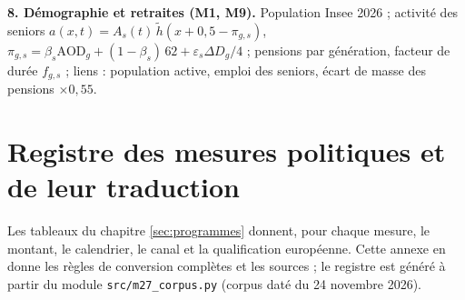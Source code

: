 \documentclass[
  11pt,
  11pt,
  a4paper,
  openany]{book}
\begin{document}
\textbf{8. Démographie et retraites (M1, M9).} Population Insee 2026 ;
activité des seniors
\(a(x,t) = A_s(t)\,\tilde h(x + 0{,}5 - \pi_{g,s})\),
\(\pi_{g,s} = \beta_s \text{AOD}_g + (1-\beta_s)\,62 + \varepsilon_s \Delta D_g / 4\)
; pensions par génération, facteur de durée \(f_{g,s}\) ; liens :
population active, emploi des seniors, écart de masse des pensions
\(\times 0{,}55\).

\hypertarget{sec:annexe-c}{%
\chapter{Registre des mesures politiques et de leur
traduction}\label{sec:annexe-c}}

Les tableaux du chapitre \ref{sec:programmes} donnent, pour chaque
mesure, le montant, le calendrier, le canal et la qualification
européenne. Cette annexe en donne les règles de conversion complètes et
les sources ; le registre est généré à partir du module
\texttt{src/m27\_corpus.py} (corpus daté du 24 novembre 2026).
\end{document}
